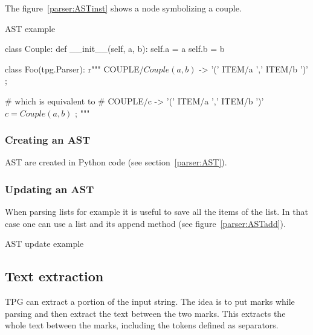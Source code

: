 The figure~\ref{parser:ASTinst} shows a node symbolizing a couple.

\begin{code}
\caption{AST example}                                           \label{parser:ASTinst}
\begin{verbatimtab}[4]

class Couple:
    def __init__(self, a, b):
        self.a = a
        self.b = b

class Foo(tpg.Parser):
    r"""
    COUPLE/$Couple(a,b)$ -> '(' ITEM/a ',' ITEM/b ')' ;

    # which is equivalent to
    # COUPLE/c -> '(' ITEM/a ',' ITEM/b ')' $ c = Couple(a,b) $ ;
    """
\end{verbatimtab}
\end{code}

\subsubsection{Creating an AST}

AST are created in Python code (see section~\ref{parser:AST}).

\subsubsection{Updating an AST}

When parsing lists for example it is useful to save all the items of the list.
In that case one can use a list and its append method (see figure~\ref{parser:ASTadd}).

\begin{code}
\caption{AST update example}                                    \label{parser:ASTadd}
\end{code}

\subsection{Text extraction}                                    \label{parser:mark}

TPG can extract a portion of the input string.
The idea is to put marks while parsing and then extract the text between the two marks.
This extracts the whole text between the marks, including the tokens defined as separators.

